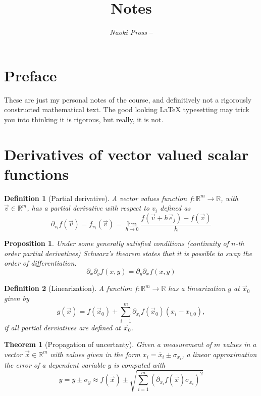 \documentclass[twocolumn, margin=normal]{tex/hsrzf}
\author{\textsl{Naoki Pross} -- \texttt{\theauthoremail}}
\title{\texttt{\themodule} Notes}
\date{\thesemester}
\theoremstyle{fuvarzf}
\newtheorem{theorem}{Theorem}
\newtheorem{proposition}{Proposition}
\newtheorem{definition}{Definition}
\begin{document}
\maketitle

\section{Preface}

These are just my personal notes of the \themodule{} course, and definitively
not a rigorously constructed mathematical text. The good looking \LaTeX{}
typesetting may trick you into thinking it is rigorous, but really, it is not.

\section{Derivatives of vector valued scalar functions}

\begin{definition}[Partial derivative]
  A vector values function \(f: \mathbb{R}^m\to\mathbb{R}\), with
  \(\vec{v}\in\mathbb{R}^m\), has a partial derivative with respect to \(v_i\)
  defined as
  \[
    \partial_{v_i} f(\vec{v})
      = f_{v_i}(\vec{v})
      = \lim_{h\to 0} \frac{f(\vec{v} + h\vec{e}_j) - f(\vec{v})}{h}
  \]
\end{definition}

\begin{proposition}
  Under some generally satisfied conditions (continuity of \(n\)-th order
  partial derivatives) Schwarz's theorem states that it is possible to swap
  the order of differentiation.
  \[
    \partial_x \partial_y f(x,y) = \partial_y \partial_x f(x,y)
  \]
\end{proposition}

\begin{definition}[Linearization]
  A function \(f: \mathbb{R}^m\to\mathbb{R}\) has a linearization \(g\) at
  \(\vec{x}_0\) given by
  \[
    g(\vec{x}) = f(\vec{x}_0) 
      + \sum_{i=1}^m \partial_{x_i} f(\vec{x}_0)(x_i - x_{i,0}) ,
  \]
  if all partial derviatives are defined at \(\vec{x}_0\).
\end{definition}

\begin{theorem}[Propagation of uncertanty]
  Given a measurement of \(m\) values in a vector \(\vec{x}\in\mathbb{R}^m\)
  with values given in the form \(x_i = \bar{x}_i \pm \sigma_{x_i}\), a linear
  approximation the error of a dependent variable \(y\) is computed with
  \[
    y = \bar{y} \pm \sigma_y \approx f(\bar{\vec{x}})
      \pm \sqrt{\sum_{i=1}^m \left(
        \partial_{x_i} f(\bar{\vec{x}}) \sigma_{x_i}\right)^2}
  \]
\end{theorem}
\end{document}
